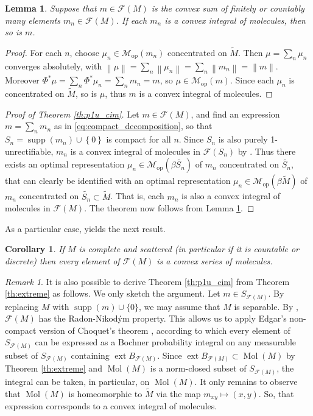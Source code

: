 \documentclass[a4paper,10pt]{amsart}
\DeclareMathOperator{\supp}{supp}                           %
\DeclareMathOperator{\ext}{ext}                             %
\newcommand{\set}[1]{\left\{{#1}\right\}}                   %
\newcommand{\norm}[1]{\left\|{#1}\right\|}                  %
\newcommand{\lipfree}[1]{\mathcal{F}({#1})}                 %
\newcommand{\wt}[1]{\widetilde{#1}}                         %
\newcommand{\bwt}[1]{\beta\wt{#1}}                          %
\newcommand{\opr}[1]{\mathcal{M}_{\mathrm{op}}(#1)}         %
\DeclareMathOperator{\Mol}{Mol}                              %
\theoremstyle{plain}
\newtheorem{lemma}[theorem]{Lemma}
\newtheorem{corollary}[theorem]{Corollary}
\theoremstyle{definition}
\theoremstyle{remark}
\newtheorem{remark}[theorem]{Remark}
\begin{document}
\begin{lemma}\label{lm:cim l1 sum}
Suppose that $m\in\lipfree{M}$ is the convex sum of finitely or countably many elements $m_n\in\lipfree{M}$. If each $m_n$ is a convex integral of molecules, then so is $m$.
\end{lemma}

\begin{proof}
For each $n$, choose $\mu_n\in\opr{m_n}$ concentrated on $\wt{M}$. Then $\mu=\sum_n\mu_n$ converges absolutely, with $\norm{\mu}=\sum_n\norm{\mu_n}=\sum_n\norm{m_n}=\norm{m}$. Moreover $\Phi^*\mu=\sum_n\Phi^*\mu_n=\sum_nm_n=m$, so $\mu\in\opr{m}$. Since each $\mu_n$ is concentrated on $\wt{M}$, so is $\mu$, thus $m$ is a convex integral of molecules.
\end{proof}

\begin{proof}[Proof of Theorem \ref{th:p1u_cim}]
Let $m\in\lipfree{M}$, and find an expression $m=\sum_n m_n$ as in \eqref{eq:compact_decomposition}, so that $S_n=\supp(m_n)\cup\set{0}$ is compact for all $n$. Since $S_n$ is also purely 1-unrectifiable, $m_n$ is a convex integral of molecules in $\lipfree{S_n}$ by \cite[Corollary 6.6]{APS2}. Thus there exists an optimal representation $\mu_n\in\opr{\bwt{S_n}}$ of $m_n$ concentrated on $\wt{S_n}$, that can clearly be identified with an optimal representation $\mu_n\in\opr{\bwt{M}}$ of $m_n$ concentrated on $\wt{S_n}\subset\wt{M}$. That is, each $m_n$ is also a convex integral of molecules in $\lipfree{M}$. The theorem now follows from Lemma \ref{lm:cim l1 sum}.
\end{proof}


As a particular case, \cite[Proposition 2.8]{APS1} yields the next result.

\begin{corollary}
If $M$ is complete and scattered (in particular if it is countable or discrete) then every element of $\lipfree{M}$ is a convex series of molecules.
\end{corollary}


\begin{remark}
It is also possible to derive Theorem \ref{th:p1u_cim} from Theorem \ref{th:extreme} as follows. We only sketch the argument. Let $m\in S_{\lipfree{M}}$. By replacing $M$ with $\supp(m)\cup\{0\}$, we may assume that $M$ is separable. By \cite[Theorem C]{AGPP}, $\lipfree{M}$ has the Radon-Nikod\'ym property. This allows us to apply Edgar's non-compact version of Choquet's theorem \cite{Edgar}, according to which every element of $S_{\lipfree{M}}$ can be expressed as a Bochner probability integral on any measurable subset of $S_{\lipfree{M}}$ containing $\ext B_{\lipfree{M}}$. Since $\ext B_{\lipfree{M}}\subset\Mol(M)$ by Theorem \ref{th:extreme} and $\Mol(M)$ is a norm-closed subset of $S_{\lipfree{M}}$, the integral can be taken, in particular, on $\Mol(M)$. It only remains to observe that $\Mol(M)$ is homeomorphic to $\wt{M}$ via the map $m_{xy}\mapsto (x,y)$. So, that expression corresponds to a convex integral of molecules.
\end{remark}
\end{document}
